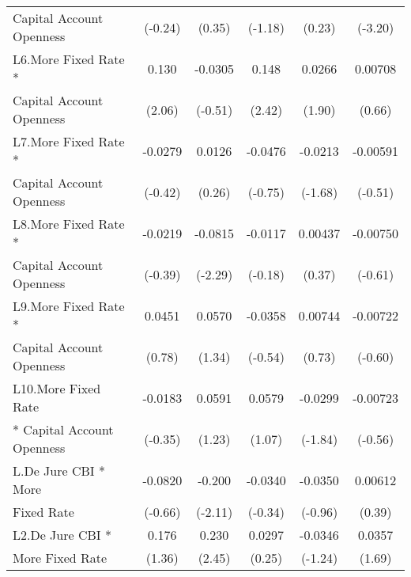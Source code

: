 {\begin{tabular}{l*{5}{c}}
Capital Account Openness&     (-0.24)         &      (0.35)         &     (-1.18)         &      (0.23)         &     (-3.20)         \\
[1em]
L6.More Fixed Rate *&       0.130\sym{*}  &     -0.0305         &       0.148\sym{*}  &      0.0266         &     0.00708         \\
Capital Account Openness&      (2.06)         &     (-0.51)         &      (2.42)         &      (1.90)         &      (0.66)         \\
[1em]
L7.More Fixed Rate *&     -0.0279         &      0.0126         &     -0.0476         &     -0.0213         &    -0.00591         \\
Capital Account Openness&     (-0.42)         &      (0.26)         &     (-0.75)         &     (-1.68)         &     (-0.51)         \\
[1em]
L8.More Fixed Rate *&     -0.0219         &     -0.0815\sym{*}  &     -0.0117         &     0.00437         &    -0.00750         \\
Capital Account Openness&     (-0.39)         &     (-2.29)         &     (-0.18)         &      (0.37)         &     (-0.61)         \\
[1em]
L9.More Fixed Rate *&      0.0451         &      0.0570         &     -0.0358         &     0.00744         &    -0.00722         \\
Capital Account Openness&      (0.78)         &      (1.34)         &     (-0.54)         &      (0.73)         &     (-0.60)         \\
[1em]
L10.More Fixed Rate &     -0.0183         &      0.0591         &      0.0579         &     -0.0299         &    -0.00723         \\
* Capital Account Openness&     (-0.35)         &      (1.23)         &      (1.07)         &     (-1.84)         &     (-0.56)         \\
[1em]
L.De Jure CBI * More&     -0.0820         &      -0.200\sym{*}  &     -0.0340         &     -0.0350         &     0.00612         \\
Fixed Rate          &     (-0.66)         &     (-2.11)         &     (-0.34)         &     (-0.96)         &      (0.39)         \\
[1em]
L2.De Jure CBI *    &       0.176         &       0.230\sym{*}  &      0.0297         &     -0.0346         &      0.0357         \\
More Fixed Rate     &      (1.36)         &      (2.45)         &      (0.25)         &     (-1.24)         &      (1.69)         \\

\end{tabular}}
